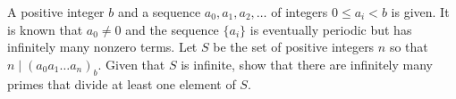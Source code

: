 A positive integer $b$ and a sequence $a_0,a_1,a_2,\dots$ of integers $0\le a_i<b$ is given. It is known that $a_0\neq 0$ and the sequence $\{a_i\}$ is eventually periodic but has infinitely many nonzero terms. Let $S$ be the set of positive integers $n$ so that $n\mid (a_0a_1\dots a_n)_b$. Given that $S$ is infinite, show that there are infinitely many primes that divide at least one element of $S$.

